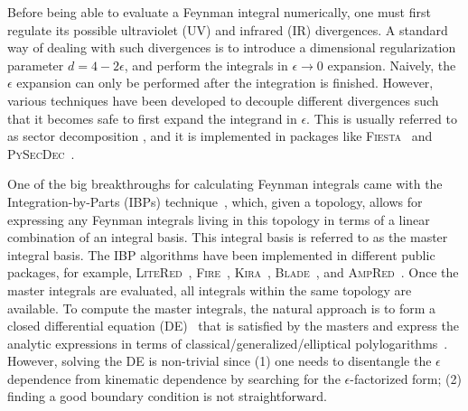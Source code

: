 \documentclass[a4paper,11pt]{article}
\begin{document}
Before being able to evaluate a Feynman integral numerically, one must first regulate its possible ultraviolet (UV)  and infrared (IR) divergences. A standard way of dealing with such divergences is to introduce a dimensional regularization parameter $d=4-2\epsilon$, and perform the integrals in $\epsilon\to 0$ expansion. Naively, the $\epsilon$ expansion can only be performed after the integration is finished. However, various techniques have been developed to decouple different divergences such that it becomes safe to first expand the integrand in $\epsilon$. This is usually referred to as sector decomposition \cite{Binoth:2000ps, Binoth:2003ak, Binoth:2004jv, Heinrich:2008si}, and it is implemented in packages like \textsc{Fiesta}~\cite{Smirnov:2008py,Smirnov:2009pb,Smirnov:2013eza,Smirnov:2015mct,Smirnov:2021rhf} and \textsc{PySecDec}~\cite{Borowka:2012yc, Borowka:2015mxa, Borowka:2017idc, Borowka:2018goh, Heinrich:2021dbf, Heinrich:2023til}. 


One of the big breakthroughs for calculating Feynman integrals came with the Integration-by-Parts (IBPs) technique~\cite{Tkachov:1981wb,Chetyrkin:1981qh}, which, given a topology, allows for expressing any Feynman integrals living in this topology in terms of a linear combination of an integral basis. This integral basis is referred to as the master integral basis. The IBP algorithms have been implemented in different public packages, for example, \textsc{LiteRed}~\cite{Lee:2012cn,Lee:2013mka}, \textsc{Fire}~\cite{Smirnov:2008iw,Smirnov:2014hma,Smirnov:2019qkx, Smirnov:2023yhb}, \textsc{Kira}~\cite{Maierhofer:2017gsa,Klappert:2020nbg,Lange:2025fba}, \textsc{Blade}~\cite{Liu:2018dmc, Guan:2019bcx, Guan:2024byi}, and \textsc{AmpRed}~\cite{Chen:2024xwt}. Once the master integrals are evaluated, all integrals within the same topology are available. To compute the master integrals, the natural approach is to form a closed differential equation (DE)~\cite{Kotikov:1990kg,Kotikov:1991pm,Bern:1993kr,Remiddi:1997ny, Henn:2013pwa} that is satisfied by the masters and express the analytic expressions in terms of classical/generalized/elliptical polylogarithms~\cite{Goncharov:1998kja, Goncharov:2001iea, Goncharov:2010jf, Duhr:2011zq, Duhr:2012fh}. However, solving the DE is non-trivial since (1) one needs to disentangle the $\epsilon$ dependence from kinematic dependence by searching for the $\epsilon$-factorized form; (2) finding a good boundary condition is not straightforward. 
\end{document}
